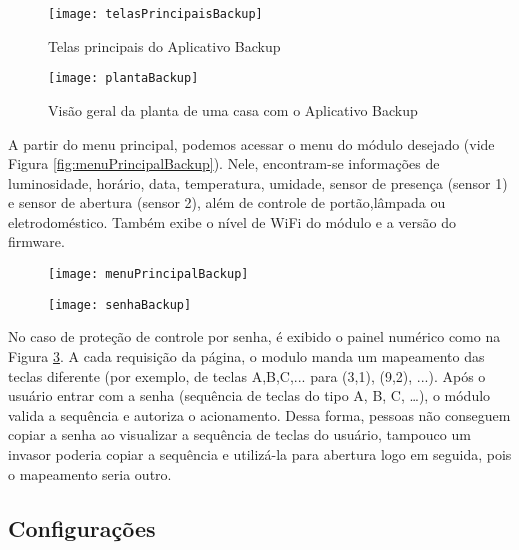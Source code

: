 \begin{figure}[H]
	\centering
	\caption{Telas principais do Aplicativo Backup}
  \texttt{[image: telasPrincipaisBackup]}
\label{fig:telasPrincipaisBackup}
\end{figure}

\begin{figure}[H]
  \centering
  \caption{Visão geral da planta de uma casa com o Aplicativo Backup}
  \texttt{[image: plantaBackup]}
  \label{fig:plantaBackup}
\end{figure}

A partir do menu principal, podemos acessar o menu do módulo desejado (vide Figura \ref{fig:menuPrincipalBackup}). Nele, encontram-se informações de luminosidade, horário, data, temperatura, umidade, sensor de presença (sensor 1) e sensor de abertura (sensor 2), além de controle de portão,lâmpada ou eletrodoméstico. Também exibe o nível de WiFi do módulo e a versão do firmware.

\begin{figure}[hbp]
    \centering
    \begin{minipage}{.4\linewidth}
        \centering
        \texttt{[image: menuPrincipalBackup]}
        \label{fig:menuPrincipalBackup}
    \end{minipage}
    \hfill
    \begin{minipage}{.4\linewidth}
        \centering
        \texttt{[image: senhaBackup]}
        \label{fig:senhaBackup}
    \end{minipage}
\end{figure}

No caso de proteção de controle por senha, é exibido o painel numérico como na Figura \ref{fig:senhaBackup}. A cada requisição da página, o modulo manda um mapeamento das teclas diferente (por exemplo, de teclas A,B,C,... para (3,1), (9,2), ...). Após o usuário entrar com a senha (sequência de teclas do tipo A, B, C, …), o módulo valida a sequência e autoriza o acionamento. Dessa forma, pessoas não conseguem copiar a senha ao visualizar a sequência de teclas do usuário, tampouco um invasor poderia copiar a sequência e utilizá-la para abertura logo em seguida, pois o mapeamento seria outro.

\subsection{Configurações}

